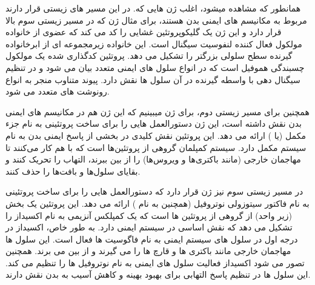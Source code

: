 \documentclass[12pt]{article}
\begin{document}
همانطور که مشاهده میشود، اغلب ژن هایی که. در این مسیر های زیستی قرار دارند مربوط به مکانیسم های ایمنی بدن هستند، برای مثال ژن  که در مسیر زیستی سوم بالا قرار دارد و این ژن یک گلیکوپروتئین غشایی را کد می کند که عضوی از خانواده مولکول فعال کننده لنفوسیت سیگنال
 است. این خانواده زیرمجموعه ای از ابرخانواده گیرنده سطح سلولی
  بزرگتر 
   را تشکیل می دهد. پروتئین کدگذاری شده یک مولکول چسبندگی هموفیل است که در انواع سلول های ایمنی متعدد بیان می شود و در تنظیم سیگنال دهی با واسطه گیرنده در آن سلول ها نقش دارد. پیوند متناوب منجر به انواع رونوشت های متعدد می شود.
 \cite{ch1, ch2}
 
 همچنین برای مسیر زیستی دوم، برای ژن 
 میبینیم که این ژن هم در مکانیسم های ایمنی بدن نقش داشته است، این ژن دستورالعمل هایی را برای ساخت پروتئینی به نام جزء مکمل 
  (یا 
  ) ارائه می دهد. این پروتئین نقش کلیدی در بخشی از پاسخ ایمنی بدن به نام سیستم مکمل دارد. سیستم کمپلمان گروهی از پروتئین‌ها است که با هم کار می‌کنند تا مهاجمان خارجی (مانند باکتری‌ها و ویروس‌ها) را از بین ببرند، التهاب را تحریک کنند و بقایای سلول‌ها و بافت‌ها را حذف کنند.
\cite{ch3}

در مسیر زیستی سوم نیز ژن 
 قرار دارد که دستورالعمل هایی را برای ساخت پروتئینی به نام فاکتور سیتوزولی نوتروفیل 
  (همچنین به نام 
  ) ارائه می دهد. این پروتئین یک بخش (زیر واحد) از گروهی از پروتئین ها است که یک کمپلکس آنزیمی به نام 
   اکسیداز را تشکیل می دهد که نقش اساسی در سیستم ایمنی دارد. به طور خاص، 
    اکسیداز در درجه اول در سلول های سیستم ایمنی به نام فاگوسیت ها فعال است. این سلول ها مهاجمان خارجی مانند باکتری ها و قارچ ها را می گیرند و از بین می برند. همچنین تصور می شود 
     اکسیداز فعالیت سلول های ایمنی به نام نوتروفیل ها را تنظیم می کند. این سلول ها در تنظیم پاسخ التهابی برای بهبود بهینه و کاهش آسیب به بدن نقش دارند.
\cite{ch4}
\end{document}
